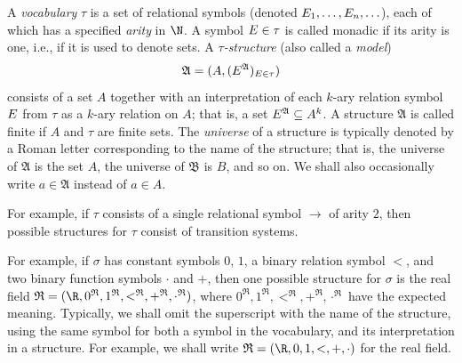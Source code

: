 \begin{samepage}
\begin{definition}
%
 A {\em vocabulary} $\tau$ is a set of relational symbols (denoted $E_1, \ldots, E_n, \ldots $), each of which has a specified
 {\em arity} in $\N$. A symbol $E \in \tau$ is called monadic if its arity is one, i.e., if it is used to
 denote sets.
%
A {\em $\tau$-structure} (also called a {\em model})
%
$$ \mathfrak{A} = (A, %
			( \relational^{\mathfrak{A}} )_{\relational \in \tau}%
			)$$
%
consists of a set $A$ together with an interpretation of
 each $k$-ary relation symbol $E$ from $\tau$ as a $k$-ary relation on $A$; that is, a
set $E^{\mathfrak{A}} \subseteq A^k$.
%
A structure $\mathfrak{A}$ is called finite if $A$ and $\tau$ are finite sets. The {\em universe} of
a structure is typically denoted by a Roman letter corresponding to the name
of the structure; that is, the universe of $\mathfrak{A}$ is the set $A$, the universe of $\mathfrak{B}$ is $B$, and so on. We shall also occasionally write $a \in \mathfrak{A}$ instead of $a \in A$.\newline
%
\end{definition}
\end{samepage}



For example, if $\tau$ consists of a single relational symbol ${ \rightarrow }$ of arity $2$, then possible structures for $\tau$ consist of transition systems. \newline


						\iffalse
For example, if $\sigma$ has constant symbols $0$, $1$, a binary relation symbol $<$,
and two binary function symbols $\cdot$ and $+$, then one possible structure for $\sigma$
is the real field $\mathfrak{R} = (\R, 0^{\mathfrak{R}}, 1^{\mathfrak{R}}, <^{\mathfrak{R}}, +^{\mathfrak{R}}, \cdot^{\mathfrak{R}})$, where $ 0^{\mathfrak{R}}, 1^{\mathfrak{R}}, <^{\mathfrak{R}}, +^{\mathfrak{R}}, \cdot^{\mathfrak{R}}$ have the expected meaning.
Typically, we shall omit the superscript with the name of the structure, using the same symbol for both a symbol in the vocabulary, and its interpretation in a structure. For example, we shall write
$ \mathfrak{R} = (\R, 0, 1, <, +, \cdot)$ for the real field.


